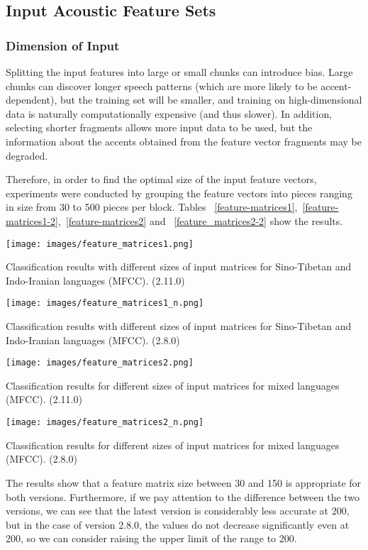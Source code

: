 \documentclass[ams]{U-AizuGT}
\begin{document}
\subsection{Input Acoustic Feature Sets}
\subsubsection{Dimension of Input}
Splitting the input features into large or small chunks can introduce bias. Large chunks can discover longer speech patterns (which are more likely to be accent-dependent), but the training set will be smaller, and training on high-dimensional data is naturally computationally expensive (and thus slower). In addition, selecting shorter fragments allows more input data to be used, but the information about the accents obtained from the feature vector fragments may be degraded.\par
Therefore, in order to find the optimal size of the input feature vectors, experiments were conducted by grouping the feature vectors into pieces ranging in size from 30 to 500 pieces per block. Tables ~\ref{feature-matrices1},~\ref{feature-matrices1-2},~\ref{feature-matrices2} and ~\ref{feature_matrices2-2} show the results.
\begin{table}[h]
    \centering
    \texttt{[image: images/feature\_matrices1.png]}
    \caption{Classification results with different sizes of input matrices for Sino-Tibetan and Indo-Iranian languages (MFCC). (2.11.0)}
    \label{feature-matrices1}
\end{table}
\begin{table}[h]
    \centering
    \texttt{[image: images/feature\_matrices1\_n.png]}
    \caption{Classification results with different sizes of input matrices for Sino-Tibetan and Indo-Iranian languages (MFCC). (2.8.0)}
    \label{feature-matrices1-2}
\end{table}

\begin{table}[h]
    \centering
    \texttt{[image: images/feature\_matrices2.png]}
    \caption{Classification results for different sizes of input matrices for mixed languages (MFCC). (2.11.0)}
    \label{feature-matrices2}
\end{table}
\begin{table}[h]
    \centering
    \texttt{[image: images/feature\_matrices2\_n.png]}
    \caption{Classification results for different sizes of input matrices for mixed languages (MFCC). (2.8.0)}
    \label{feature-matrices2-2}
\end{table}
\clearpage
The results show that a feature matrix size between 30 and 150 is appropriate for both versions. Furthermore, if we pay attention to the difference between the two versions, we can see that the latest version is considerably less accurate at 200, but in the case of version 2.8.0, the values do not decrease significantly even at 200, so we can consider raising the upper limit of the range to 200.
\end{document}
